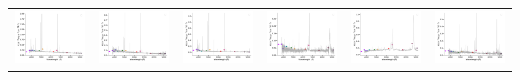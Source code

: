 \begin{center}
\begin{longtable}{l l l l l l }
    \includegraphics[width=0.3\linewidth, clip]{Figs/Figs-sdss/spec-1106-52912-0102-SPLUS-s02s05-046746.pdf} & \includegraphics[width=0.3\linewidth, clip]{Figs/Figs-sdss/spec-1106-52912-0194-STRIPE82-0129-031160.pdf} & \includegraphics[width=0.3\linewidth, clip]{Figs/Figs-sdss/spec-1106-52912-0456-STRIPE82-0130-042161.pdf} & \includegraphics[width=0.3\linewidth, clip]{Figs/Figs-sdss/spec-1115-52914-0588-STRIPE82-0108-009933.pdf} & \includegraphics[width=0.3\linewidth, clip]{Figs/Figs-sdss/spec-1116-52932-0478-STRIPE82-0104-027921.pdf} & \includegraphics[width=0.3\linewidth, clip]{Figs/Figs-sdss/spec-1117-52885-0395-STRIPE82-0100-021070.pdf} \\

\end{longtable}
\end{center}
